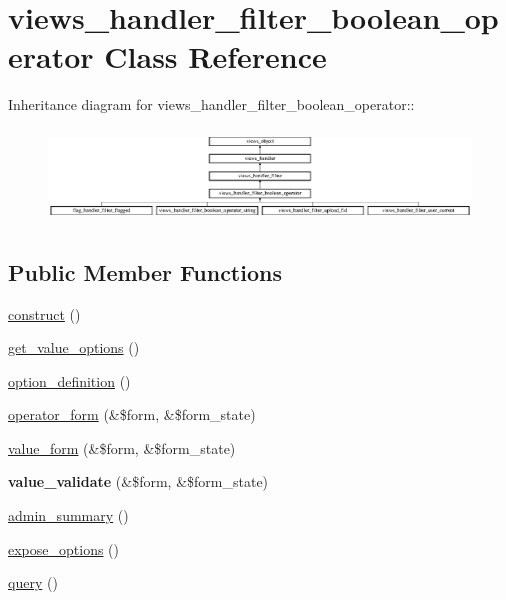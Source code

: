 \hypertarget{classviews__handler__filter__boolean__operator}{
\section{views\_\-handler\_\-filter\_\-boolean\_\-operator Class Reference}
\label{classviews__handler__filter__boolean__operator}
}
Inheritance diagram for views\_\-handler\_\-filter\_\-boolean\_\-operator::\begin{figure}[H]
\begin{center}
\leavevmode
\includegraphics[height=2.50896cm]{classviews__handler__filter__boolean__operator}
\end{center}
\end{figure}
\subsection*{Public Member Functions}
\begin{CompactItemize}
\item 
\hyperlink{classviews__handler__filter__boolean__operator_659352df10ef3144359e90247f450ef2}{construct} ()
\item 
\hyperlink{classviews__handler__filter__boolean__operator_d2c5508cee59025448c3c18a862976d8}{get\_\-value\_\-options} ()
\item 
\hyperlink{classviews__handler__filter__boolean__operator_f2103bf9a481a2a2eb4d5c0e6baf2b77}{option\_\-definition} ()
\item 
\hyperlink{classviews__handler__filter__boolean__operator_2b8c0523843b8f24144bf5a59254cdd9}{operator\_\-form} (\&\$form, \&\$form\_\-state)
\item 
\hyperlink{classviews__handler__filter__boolean__operator_1680256640c960fef88ad1485cfb91f7}{value\_\-form} (\&\$form, \&\$form\_\-state)
\item 
\hypertarget{classviews__handler__filter__boolean__operator_c316f62a935db76a64d01478e41a2d0a}{
\textbf{value\_\-validate} (\&\$form, \&\$form\_\-state)}
\label{classviews__handler__filter__boolean__operator_c316f62a935db76a64d01478e41a2d0a}

\item 
\hyperlink{classviews__handler__filter__boolean__operator_7b58a9b58ae9778383b6a215834d7cdb}{admin\_\-summary} ()
\item 
\hyperlink{classviews__handler__filter__boolean__operator_24ff1f565f02838bc2a63939ab510d89}{expose\_\-options} ()
\item 
\hyperlink{classviews__handler__filter__boolean__operator_b3afc650701939c060e684d75fa2b21b}{query} ()
\end{CompactItemize}
